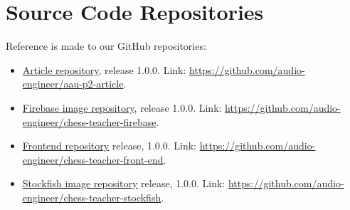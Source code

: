 \chapter{Source Code Repositories}\label{ch:source-code-repositories}

Reference is made to our GitHub repositories:

\begin{itemize}
    \item \href{https://github.com/audio-engineer/aau-p2-article}{Article repository}, release 1.0.0.
    Link: \url{https://github.com/audio-engineer/aau-p2-article}.
    \item \href{https://github.com/audio-engineer/chess-teacher-firebase}{Firebase image repository}, release 1.0.0.
    Link: \url{https://github.com/audio-engineer/chess-teacher-firebase}.
    \item \href{https://github.com/audio-engineer/chess-teacher-front-end}{Frontend repository} release, 1.0.0.
    Link: \url{https://github.com/audio-engineer/chess-teacher-front-end}.
    \item \href{https://github.com/audio-engineer/chess-teacher-stockfish}{Stockfish image repository} release, 1.0.0.
    Link: \url{https://github.com/audio-engineer/chess-teacher-stockfish}.
\end{itemize}

